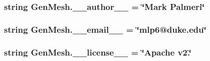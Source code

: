 \subsubsection[{\+\_\+\+\_\+author\+\_\+\+\_\+}]{\setlength{\rightskip}{0pt plus 5cm}string Gen\+Mesh.\+\_\+\+\_\+author\+\_\+\+\_\+ = \char`\"{}Mark Palmeri\char`\"{}}\label{namespaceGenMesh_ae72bab920317d34184cbb5299b5f8105}
\hypertarget{namespaceGenMesh_a0d6434d536da6f76b95e6c47f8399d32}{}
\subsubsection[{\+\_\+\+\_\+email\+\_\+\+\_\+}]{\setlength{\rightskip}{0pt plus 5cm}string Gen\+Mesh.\+\_\+\+\_\+email\+\_\+\+\_\+ = \char`\"{}mlp6@duke.\+edu\char`\"{}}\label{namespaceGenMesh_a0d6434d536da6f76b95e6c47f8399d32}
\hypertarget{namespaceGenMesh_a2098deb4051637a89446d6660704ff62}{}
\subsubsection[{\+\_\+\+\_\+license\+\_\+\+\_\+}]{\setlength{\rightskip}{0pt plus 5cm}string Gen\+Mesh.\+\_\+\+\_\+license\+\_\+\+\_\+ = \char`\"{}Apache v2.\char`\"{}}\label{namespaceGenMesh_a2098deb4051637a89446d6660704ff62}
